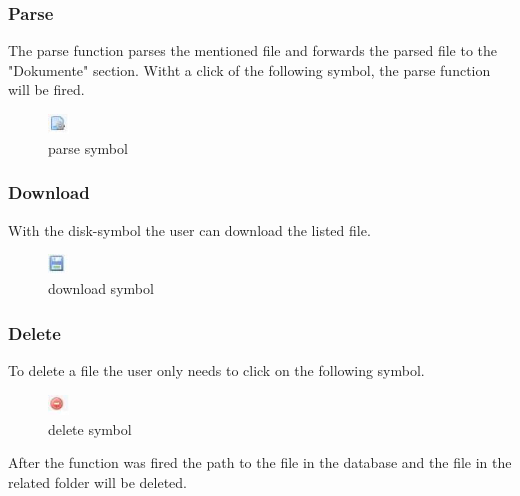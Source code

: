 \subsubsection{Parse}
The parse function parses the mentioned file and forwards the parsed file to the "Dokumente" section.
Witht a click of the following symbol, the parse function will be fired.
\begin{figure}[!ht]
  \centering
    \includegraphics[width=0.05\textwidth]{images/basic_functionalities/parse_symbol.jpg}
  \caption{parse symbol}
  \label{fig:parse symbol}
\end{figure}
\subsubsection{Download}
With the disk-symbol the user can download the listed file.
\begin{figure}[!ht]
  \centering
    \includegraphics[width=0.05\textwidth]{images/basic_functionalities/download_symbol.jpg}
  \caption{download symbol}
  \label{fig:download symbol}
\end{figure}
\subsubsection{Delete}
To delete a file the user only needs to click on the following symbol.
\begin{figure}[!ht]
  \centering
    \includegraphics[width=0.05\textwidth]{images/basic_functionalities/delete_symbol.jpg}
  \caption{delete symbol}
  \label{fig:delete symbol}
\end{figure}
After the function was fired the path to the file in the database and the file in the related folder will be deleted.
